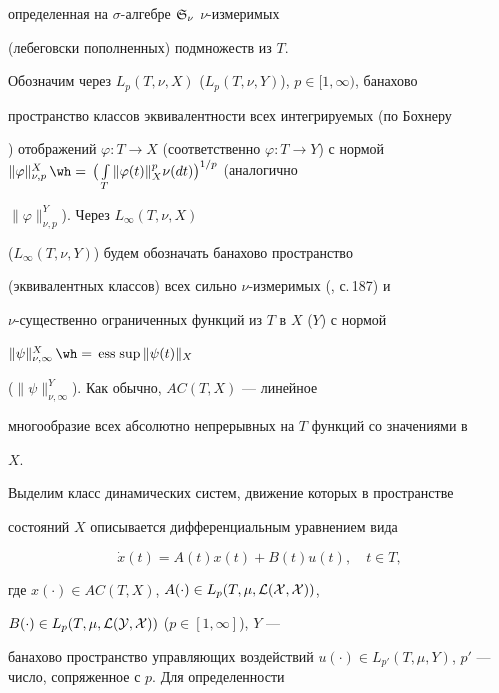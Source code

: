 определенная на $\sigma$-алгебре $\frak S_\nu$\; $\nu$-измеримых 


(лебеговски пополненных) подмножеств из $T$. 


 


Обозначим через $L_p(T,\nu,X)$ ($L_p(T,\nu,Y)$), $p\in[1,\infty)$, банахово 


пространство классов эквивалентности всех интегрируемых (по Бохнеру 


\cite{12}) отображений $\varphi:T\to X$ (соответственно $\varphi:T\to 


Y$) с нормой $\|\varphi\|^X_{\nu,p}\hateq\big(\int\limits_T 


\|\varphi(t)\|^p_X \nu(dt)\big)^{1/p}$ (аналогично 


$\|\varphi\|^Y_{\nu,p}$). Через $L_\infty(T,\nu,X)$ 


($L_\infty(T,\nu,Y)$) будем обозначать банахово пространство 


(эквивалентных классов) всех сильно $\nu$-измеримых (\cite{12}, с.\,187) и 


$\nu$-существенно ограниченных функций из $T$ в $X$ ($Y$) с нормой 


$\|\psi\|^X_{\nu,\infty}\hateq \esssup\|\psi(t)\|_X$ 


($\|\psi\|^Y_{\nu,\infty}$). Как обычно, $AC(T,X)$ --- линейное 


многообразие всех абсолютно непрерывных на $T$ функций со значениями в 


$X$. 


 


Выделим класс динамических систем, движение которых в пространстве 


состояний $X$ описывается дифференциальным уравнением вида 


\begin{equation} 


\Dot x(t)=A(t)x(t)+B(t)u(t),\quad t\in T, 


\end{equation} 


где $x(\cdot)\in AC(T,X)$, $A(\cdot)\in L_p(T,\mu,\cal L(X,X))$, 


$B(\cdot)\in L_p(T,\mu,\cal L(Y,X))$ ($p\in[1,\infty]$), $Y$ --- 


банахово пространство управляющих воздействий $u(\cdot)\in 


L_{p'}(T,\mu,Y)$, $p'$ --- число, сопряженное с $p$. Для определенности 


